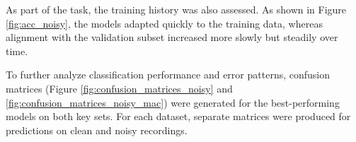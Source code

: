 \documentclass[a4paper,11pt,twoside]{report}
\theoremstyle{definition}
\begin{document}
As part of the task, the training history was also assessed. As shown in Figure \ref{fig:acc_noisy}, the models adapted quickly to the training data, whereas alignment with the validation subset increased more slowly but steadily over time.


To further analyze classification performance and error patterns, confusion matrices (Figure \ref{fig:confusion_matrices_noisy} and \ref{fig:confusion_matrices_noisy_mac}) were generated for the best-performing models on both key sets. For each dataset, separate matrices were produced for predictions on clean and noisy recordings.



\end{document}
